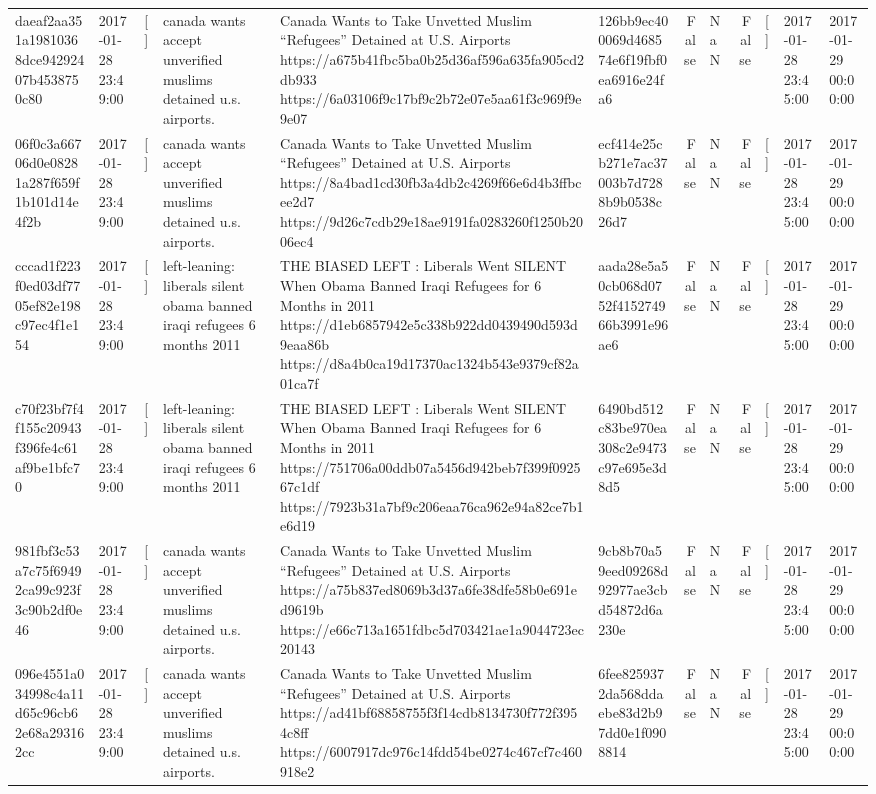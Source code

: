 \begin{tabular}{llllllrlrlll}
daeaf2aa351a19810368dce94292407b4538750c80 & 2017-01-28 23:49:00 & [] & canada wants accept unverified muslims detained u.s. airports. & Canada Wants to Take Unvetted Muslim “Refugees” Detained at U.S. Airports https://a675b41fbc5ba0b25d36af596a635fa905cd2db933 https://6a03106f9c17bf9c2b72e07e5aa61f3c969f9e9e07 & 126bb9ec400069d468574e6f19fbf0ea6916e24fa6 & False & NaN & False & [] & 2017-01-28 23:45:00 & 2017-01-29 00:00:00 \\
06f0c3a66706d0e08281a287f659f1b101d14e4f2b & 2017-01-28 23:49:00 & [] & canada wants accept unverified muslims detained u.s. airports. & Canada Wants to Take Unvetted Muslim “Refugees” Detained at U.S. Airports https://8a4bad1cd30fb3a4db2c4269f66e6d4b3ffbcee2d7 https://9d26c7cdb29e18ae9191fa0283260f1250b2006ec4 & ecf414e25cb271e7ac37003b7d7288b9b0538c26d7 & False & NaN & False & [] & 2017-01-28 23:45:00 & 2017-01-29 00:00:00 \\
cccad1f223f0ed03df7705ef82e198c97ec4f1e154 & 2017-01-28 23:49:00 & [] & left-leaning: liberals silent obama banned iraqi refugees 6 months 2011 & THE BIASED LEFT : Liberals Went SILENT When Obama Banned Iraqi Refugees for 6 Months in 2011 https://d1eb6857942e5c338b922dd0439490d593d9eaa86b https://d8a4b0ca19d17370ac1324b543e9379cf82a01ca7f & aada28e5a50cb068d0752f415274966b3991e96ae6 & False & NaN & False & [] & 2017-01-28 23:45:00 & 2017-01-29 00:00:00 \\
c70f23bf7f4f155c20943f396fe4c61af9be1bfc70 & 2017-01-28 23:49:00 & [] & left-leaning: liberals silent obama banned iraqi refugees 6 months 2011 & THE BIASED LEFT : Liberals Went SILENT When Obama Banned Iraqi Refugees for 6 Months in 2011 https://751706a00ddb07a5456d942beb7f399f092567c1df https://7923b31a7bf9c206eaa76ca962e94a82ce7b1e6d19 & 6490bd512c83be970ea308c2e9473c97e695e3d8d5 & False & NaN & False & [] & 2017-01-28 23:45:00 & 2017-01-29 00:00:00 \\
981fbf3c53a7c75f69492ca99c923f3c90b2df0e46 & 2017-01-28 23:49:00 & [] & canada wants accept unverified muslims detained u.s. airports. & Canada Wants to Take Unvetted Muslim “Refugees” Detained at U.S. Airports https://a75b837ed8069b3d37a6fe38dfe58b0e691ed9619b https://e66c713a1651fdbc5d703421ae1a9044723ec20143 & 9cb8b70a59eed09268d92977ae3cbd54872d6a230e & False & NaN & False & [] & 2017-01-28 23:45:00 & 2017-01-29 00:00:00 \\
096e4551a034998c4a11d65c96cb62e68a293162cc & 2017-01-28 23:49:00 & [] & canada wants accept unverified muslims detained u.s. airports. & Canada Wants to Take Unvetted Muslim “Refugees” Detained at U.S. Airports https://ad41bf68858755f3f14cdb8134730f772f3954c8ff https://6007917dc976c14fdd54be0274c467cf7c460918e2 & 6fee8259372da568ddaebe83d2b97dd0e1f0908814 & False & NaN & False & [] & 2017-01-28 23:45:00 & 2017-01-29 00:00:00 \\

\end{tabular}
